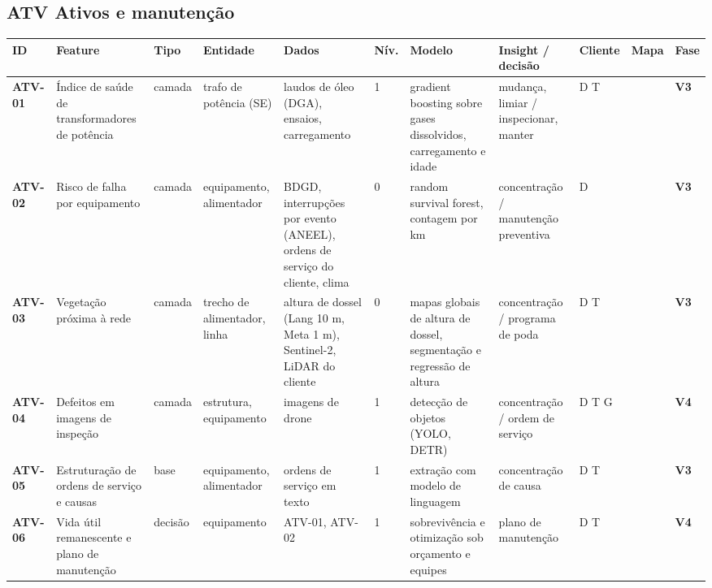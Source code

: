 \subsection*{ATV \textperiodcentered{} Ativos e manutenção}
\label{cat:ATV}
{\footnotesize\setlength{\tabcolsep}{3pt}
\begin{longtable}{@{}P{1.35cm}P{4.1cm}P{1.3cm}P{3.1cm}P{3.7cm}C{0.6cm}P{3.6cm}P{3.3cm}P{1.1cm}P{0.9cm}P{1.1cm}@{}}
\toprule
\textbf{ID} & \textbf{Feature} & \textbf{Tipo} & \textbf{Entidade} & \textbf{Dados} & \textbf{Nív.} & \textbf{Modelo} & \textbf{Insight / decisão} & \textbf{Cliente} & \textbf{Mapa} & \textbf{Fase} \\
\midrule\endhead
\textbf{ATV-01} & Índice de saúde de transformadores de potência & camada & trafo de potência (SE) & laudos de óleo (DGA), ensaios, carregamento & 1 & gradient boosting sobre gases dissolvidos, carregamento e idade & mudança, limiar / inspecionar, manter & D T &  & \colorbox{fV3}{\scriptsize \textbf{V3}} \\
\textbf{ATV-02} & Risco de falha por equipamento & camada & equipamento, alimentador & BDGD, interrupções por evento (ANEEL), ordens de serviço do cliente, clima & 0 & random survival forest, contagem por km & concentração / manutenção preventiva & D &  & \colorbox{fV3}{\scriptsize \textbf{V3}} \\
\textbf{ATV-03} & Vegetação próxima à rede & camada & trecho de alimentador, linha & altura de dossel (Lang 10 m, Meta 1 m), Sentinel-2, LiDAR do cliente & 0 & mapas globais de altura de dossel, segmentação e regressão de altura & concentração / programa de poda & D T &  & \colorbox{fV3}{\scriptsize \textbf{V3}} \\
\textbf{ATV-04} & Defeitos em imagens de inspeção & camada & estrutura, equipamento & imagens de drone & 1 & detecção de objetos (YOLO, DETR) & concentração / ordem de serviço & D T G &  & \colorbox{fV4}{\scriptsize \textbf{V4}} \\
\textbf{ATV-05} & Estruturação de ordens de serviço e causas & base & equipamento, alimentador & ordens de serviço em texto & 1 & extração com modelo de linguagem & concentração de causa & D T &  & \colorbox{fV3}{\scriptsize \textbf{V3}} \\
\textbf{ATV-06} & Vida útil remanescente e plano de manutenção & decisão & equipamento & ATV-01, ATV-02 & 1 & sobrevivência e otimização sob orçamento e equipes & plano de manutenção & D T &  & \colorbox{fV4}{\scriptsize \textbf{V4}} \\
\bottomrule
\end{longtable}}

